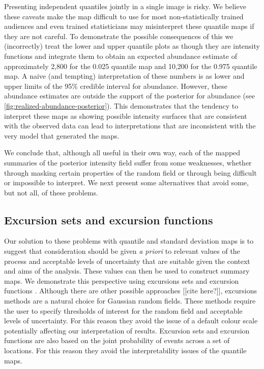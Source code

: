 \documentclass{stylefile16/statsoc}
\begin{document}
Presenting independent quantiles jointly in a single image is risky.  We believe these caveats make the map difficult to use for most non-statistically trained audiences and even trained statisticians may misinterpret these quantile maps if they are not careful.  To demonstrate the possible consequences of this we (incorrectly) treat the lower and upper quantile plots as though they are intensity functions and integrate them to obtain an expected abundance estimate of approximately 2,800 for the 0.025 quantile map and 10,200 for the 0.975 quantile map.  A naive (and tempting) interpretation of these numbers is as lower and upper limits of the 95\% credible interval for abundance. However, these abundance estimates are outside the support of the posterior for abundance (see \autoref{fig:realized-abundance-posterior}).  This demonstrates that the tendency to interpret these maps as showing possible intensity surfaces that are consistent with the observed data can lead to interpretations that are inconsistent with the very model that generated the maps.

We conclude that, although all useful in their own way, each of the mapped summaries of the posterior intensity field suffer from some weaknesses, whether through masking certain properties of the random field or through being difficult or impossible to interpret.  We next present some alternatives that avoid some, but not all, of these problems. 

\subsection{Excursion sets and excursion functions}

Our solution to these problems with quantile and standard deviation maps is to suggest that consideration should be given \emph{a priori} to relevant values of the process and acceptable levels of uncertainty that are suitable given the context and aims of the analysis.  These values can then be used to construct summary maps.  We demonstrate this perspective using excursions sets and excursion functions \citep{bolin_excursion_2015}.  Although there are other possible approaches [[cite here?]], excursions methods are a natural choice for Gaussian random fields.  These methods require the user to specify thresholds of interest for the random field and acceptable levels of uncertainty.  For this reason they avoid the issue of a default colour scale potentially affecting our interpretation of results.  Excursion sets and excursion functions are also based on the joint probability of events across a set of locations.  For this reason they avoid the interpretability issues of the quantile maps.
\end{document}
